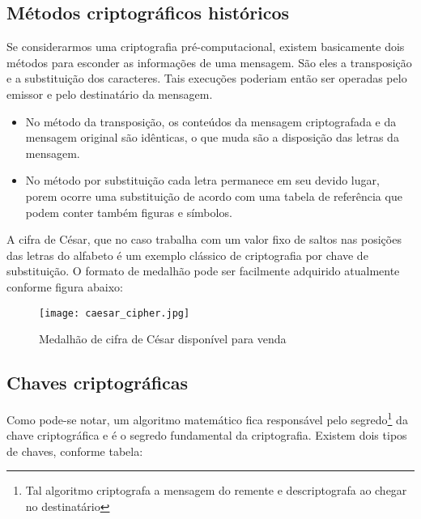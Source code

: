   \subsection{Métodos criptográficos históricos}
  
  Se considerarmos uma criptografia pré-computacional,  existem basicamente dois métodos para esconder as informações de uma mensagem. São eles a transposição e a substituição dos caracteres. Tais execuções poderiam então ser operadas pelo emissor e pelo destinatário da mensagem.
  \begin{itemize} 
  	\item No método da transposição, os conteúdos da mensagem criptografada e da mensagem original são idênticas, o que muda são a disposição das letras da mensagem.
  	\item No método por substituição cada letra permanece em seu devido lugar, porem ocorre uma substituição de acordo com uma tabela de referência que podem conter também figuras e símbolos.
  \end{itemize}

A cifra de César, que no caso trabalha com um valor fixo de saltos nas posições das letras do alfabeto é um exemplo clássico de criptografia por chave de substituição. O formato de medalhão pode ser facilmente adquirido atualmente conforme figura abaixo:

\begin{figure}[H]
	\centering
	\caption{Medalhão de cifra de César disponível para venda}
	\texttt{[image: caesar\_cipher.jpg]}\\
		
\end{figure}


  \subsection{Chaves criptográficas}
  Como pode-se notar, um algoritmo matemático fica responsável pelo segredo\footnote{Tal algoritmo criptografa a mensagem do remente e descriptografa ao chegar no destinatário} da chave criptográfica e é o segredo fundamental da criptografia. Existem dois tipos de chaves, conforme tabela:
  

